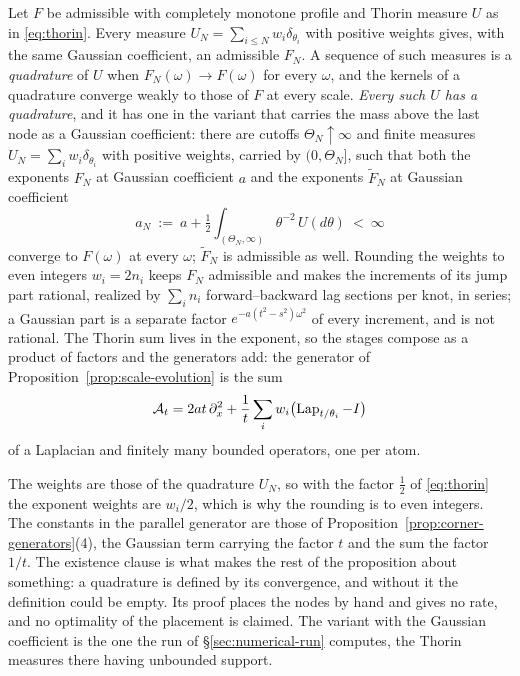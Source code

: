 \begin{proposition}\label{prop:thorin-machine}
Let $F$ be admissible with completely monotone profile and Thorin measure $U$ as in
\ref{eq:thorin}. Every measure $U_N = \sum_{i \le N} w_i\delta_{\theta_i}$ with positive weights gives,
with the same Gaussian coefficient, an admissible $F_N$. A sequence of such measures is a
\emph{quadrature} of $U$ when $F_N(\omega) \to F(\omega)$ for every $\omega$, and the kernels of
a quadrature converge weakly to those of $F$ at every scale. \emph{Every such $U$ has a
quadrature}, and it has one in the variant that carries the mass above the last node as a Gaussian
coefficient: there are cutoffs $\Theta_N \uparrow \infty$ and finite measures
$U_N = \sum_i w_i\delta_{\theta_i}$ with positive weights, carried by $(0,\Theta_N]$, such that
both the exponents $F_N$ at Gaussian coefficient $a$ and the exponents $\tilde F_N$ at Gaussian
coefficient
\[
  a_N \ :=\ a + \tfrac12\int_{(\Theta_N,\infty)}\theta^{-2}\,U(d\theta) \ <\ \infty
\]
converge to $F(\omega)$ at every $\omega$; $\tilde F_N$ is admissible as well. Rounding the weights to even
integers $w_i = 2n_i$ keeps $F_N$ admissible and makes the increments of its jump part rational,
realized by $\sum_i n_i$ forward--backward lag sections per knot, in series; a Gaussian part is
a separate factor $e^{-a(t^2-s^2)\omega^2}$ of every increment, and is not rational. The Thorin sum
lives in the exponent, so the stages compose as a product of factors and the generators add: the
generator of Proposition~\ref{prop:scale-evolution} is the sum
\[
  \mathcal{A}_t = 2at\,\partial_x^2
   + \frac1t\sum_i w_i\bigl(\operatorname{Lap}_{t/\theta_i} - I\bigr)
\]
of a Laplacian and finitely many bounded operators, one per atom.
\end{proposition}

The weights are those of the quadrature $U_N$, so with the factor $\tfrac12$ of
\ref{eq:thorin} the exponent weights are $w_i/2$, which is why the rounding is to even
integers. The constants in the parallel generator are those of
Proposition~\ref{prop:corner-generators}(4), the Gaussian term carrying the factor $t$ and the
sum the factor $1/t$. The existence clause is what makes the rest of the proposition about
something: a quadrature is defined by its convergence, and without it the definition could be
empty. Its proof places the nodes by hand and gives no rate, and no optimality of the placement
is claimed. The variant with the Gaussian coefficient is the one the run of
\S\ref{sec:numerical-run} computes, the Thorin measures there having unbounded support.

